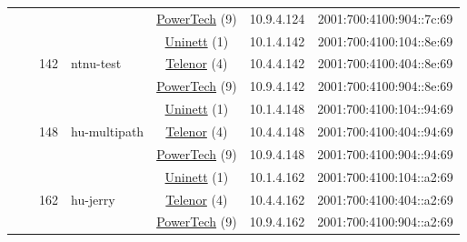 \begin{small}
\begin{center}
\begin{longtable}{|c|c|c|c|c|c|c|c|}
  &  &  &  & \multicolumn{2}{|c|}{\tiny{\href{http://www.powertech.no}{PowerTech} (9)}} & \tiny{10.9.4.124} & \tiny{2001:700:4100:904::7c:69} \\* \cline{3-3}\cline{4-4}\cline{5-5}\cline{6-6}\cline{7-7}\cline{8-8}
  &  & \multirow{3}{*}{\tiny{142}} & \multicolumn{1}{|l|}{\multirow{3}{*}{\tiny{ntnu-test}}} & \multicolumn{2}{|c|}{\tiny{\href{https://www.uninett.no}{Uninett} (1)}} & \tiny{10.1.4.142} & \tiny{2001:700:4100:104::8e:69} \\* \cline{5-5}\cline{6-6}\cline{7-7}\cline{8-8}
  &  &  &  & \multicolumn{2}{|c|}{\tiny{\href{https://www.telenor.no}{Telenor} (4)}} & \tiny{10.4.4.142} & \tiny{2001:700:4100:404::8e:69} \\* \cline{5-5}\cline{6-6}\cline{7-7}\cline{8-8}
  &  &  &  & \multicolumn{2}{|c|}{\tiny{\href{http://www.powertech.no}{PowerTech} (9)}} & \tiny{10.9.4.142} & \tiny{2001:700:4100:904::8e:69} \\* \cline{3-3}\cline{4-4}\cline{5-5}\cline{6-6}\cline{7-7}\cline{8-8}
  &  & \multirow{3}{*}{\tiny{148}} & \multicolumn{1}{|l|}{\multirow{3}{*}{\tiny{hu-multipath}}} & \multicolumn{2}{|c|}{\tiny{\href{https://www.uninett.no}{Uninett} (1)}} & \tiny{10.1.4.148} & \tiny{2001:700:4100:104::94:69} \\* \cline{5-5}\cline{6-6}\cline{7-7}\cline{8-8}
  &  &  &  & \multicolumn{2}{|c|}{\tiny{\href{https://www.telenor.no}{Telenor} (4)}} & \tiny{10.4.4.148} & \tiny{2001:700:4100:404::94:69} \\* \cline{5-5}\cline{6-6}\cline{7-7}\cline{8-8}
  &  &  &  & \multicolumn{2}{|c|}{\tiny{\href{http://www.powertech.no}{PowerTech} (9)}} & \tiny{10.9.4.148} & \tiny{2001:700:4100:904::94:69} \\* \cline{3-3}\cline{4-4}\cline{5-5}\cline{6-6}\cline{7-7}\cline{8-8}
  &  & \multirow{3}{*}{\tiny{162}} & \multicolumn{1}{|l|}{\multirow{3}{*}{\tiny{hu-jerry}}} & \multicolumn{2}{|c|}{\tiny{\href{https://www.uninett.no}{Uninett} (1)}} & \tiny{10.1.4.162} & \tiny{2001:700:4100:104::a2:69} \\* \cline{5-5}\cline{6-6}\cline{7-7}\cline{8-8}
  &  &  &  & \multicolumn{2}{|c|}{\tiny{\href{https://www.telenor.no}{Telenor} (4)}} & \tiny{10.4.4.162} & \tiny{2001:700:4100:404::a2:69} \\* \cline{5-5}\cline{6-6}\cline{7-7}\cline{8-8}
  &  &  &  & \multicolumn{2}{|c|}{\tiny{\href{http://www.powertech.no}{PowerTech} (9)}} & \tiny{10.9.4.162} & \tiny{2001:700:4100:904::a2:69} \\* \cline{3-3}\cline{4-4}\cline{5-5}\cline{6-6}\cline{7-7}\cline{8-8}

\end{longtable}
\end{center}
\end{small}
